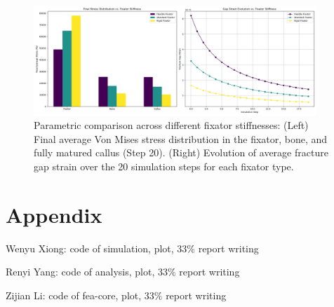 \documentclass{article}
\begin{document}
\begin{figure}[H]
  \centering
  \includegraphics[width=0.95\textwidth]{../output_advanced/parametric_comparison.png}
  \caption{Parametric comparison across different fixator stiffnesses: (Left) Final average Von Mises stress distribution in the fixator, bone, and fully matured callus (Step 20). (Right) Evolution of average fracture gap strain over the 20 simulation steps for each fixator type.}
  \label{fig:parametric_comparison}
\end{figure}

\section{Appendix}

Wenyu Xiong: code of simulation, plot, 33$\%$ report writing

Renyi Yang: code of analysis, plot, 33$\%$ report writing

Zijian Li: code of fea-core, plot, 33$\%$ report writing







\end{document}
